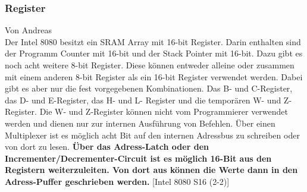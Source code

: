 \documentclass[12pt]{article}
\begin{document}
\subsubsection{Register}
\label{RegisterSection}
Von Andreas\\ \noindent
Der Intel 8080 besitzt ein SRAM Array mit 16-bit Register. Darin enthalten sind der Programm Counter mit 16-bit und der Stack Pointer mit 16-bit. Dazu gibt es noch acht weitere 8-bit Register. Diese können entweder alleine oder zusammen mit einem anderen 8-bit Register als ein 16-bit Register verwendet werden. Dabei gibt es aber nur die fest vorgegebenen Kombinationen. Das B- und C-Register, das D- und E-Register, das H- und L- Register und die temporären W- und Z- Register. Die W- und Z-Register können nicht vom Programmierer verwendet werden und dienen nur zur internen Ausführung von Befehlen. 
Über einen Multiplexer ist es möglich acht Bit auf den internen Adressbus zu schreiben oder von dort zu lesen. \textbf{Über das Adress-Latch oder den Incrementer/Decrementer-Circuit ist es möglich 16-Bit aus den Registern weiterzuleiten. Von dort aus können die Werte dann in den Adress-Puffer geschrieben werden.} [Intel 8080 S16 (2-2)]
\end{document}
